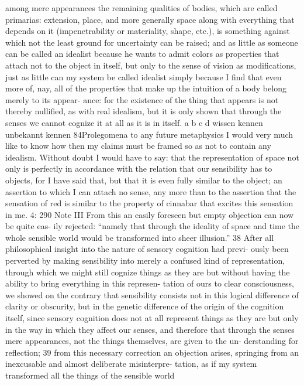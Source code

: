 among mere appearances the remaining qualities of bodies, which are
called primarias: extension, place, and more generally space along with
everything that depends on it (impenetrability or materiality, shape, etc.),
is something against which not the least ground for uncertainty can be
raised; and as little as someone can be called an idealist because he wants
to admit colors as properties that attach not to the object in itself, but
only to the sense of vision as modiﬁcations, just as little can my system
be called idealist simply because I ﬁnd that even more of, nay, all of the
properties that make up the intuition of a body belong merely to its appear-
ance: for the existence of the thing that appears is not thereby nulliﬁed,
as with real idealism, but it is only shown that through the senses we
cannot cognize it at all as it is in itself.
a
b
c
d
wissen
kennen
unbekannt
kennen
84Prolegomena to any future metaphysics
I would very much like to know how then my claims must be framed
so as not to contain any idealism. Without doubt I would have to say: that
the representation of space not only is perfectly in accordance with the
relation that our sensibility has to objects, for I have said that, but that it
is even fully similar to the object; an assertion to which I can attach no
sense, any more than to the assertion that the sensation of red is similar
to the property of cinnabar that excites this sensation in me.
4: 290
Note III
From this an easily foreseen but empty objection can now be quite eas-
ily rejected: “namely that through the ideality of space and time the
whole sensible world would be transformed into sheer illusion.” 38 After
all philosophical insight into the nature of sensory cognition had previ-
ously been perverted by making sensibility into merely a confused kind
of representation, through which we might still cognize things as they
are but without having the ability to bring everything in this represen-
tation of ours to clear consciousness, we showed on the contrary that
sensibility consists not in this logical difference of clarity or obscurity,
but in the genetic difference of the origin of the cognition itself, since
sensory cognition does not at all represent things as they are but only in
the way in which they affect our senses, and therefore that through the
senses mere appearances, not the things themselves, are given to the un-
derstanding for reﬂection; 39 from this necessary correction an objection
arises, springing from an inexcusable and almost deliberate misinterpre-
tation, as if my system transformed all the things of the sensible world
